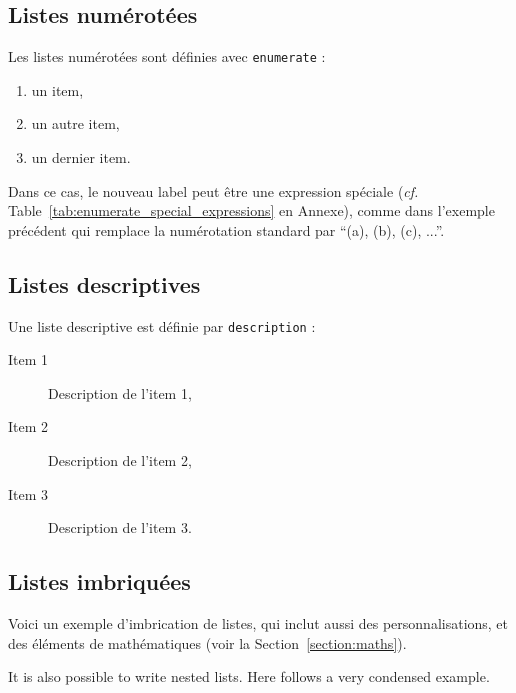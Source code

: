 \documentclass[a4paper, 12pt]{report}
\begin{document}
    \subsection{Listes numérotées}
    Les listes numérotées sont définies avec \verb+enumerate+ :
    \begin{enumerate}[label=(\alph*)]
        \item un item,
        \item un autre item,
        \item un dernier item.
    \end{enumerate}
      Dans ce cas, le nouveau label peut être une expression spéciale (\emph{cf.} Table~\ref{tab:enumerate_special_expressions} en Annexe), comme dans l'exemple précédent qui remplace la numérotation standard par \enquote{(a), (b), (c), ...}.
    
    \subsection{Listes descriptives}
    Une liste descriptive est définie par \verb+description+ :
    \begin{description}
        \item[Item 1] Description de l'item 1,
        \item[Item 2] Description de l'item 2,
        \item[Item 3] Description de l'item 3.
    \end{description}

    \subsection{Listes imbriquées}
    Voici un exemple d'imbrication de listes, qui inclut aussi des personnalisations, et des éléments de mathématiques (voir la Section~\ref{section:maths}).
    
    It is also possible to write nested lists. Here follows a very condensed example.
\end{document}
